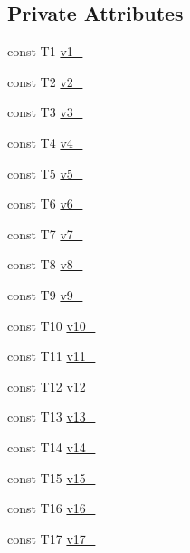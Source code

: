 \subsection*{\-Private \-Attributes}
\begin{DoxyCompactItemize}
\item 
const \-T1 \hyperlink{classtesting_1_1internal_1_1ValueArray17_aac1d0654cc6c1aceb4a5d0fa7a98042e}{v1\-\_\-}
\item 
const \-T2 \hyperlink{classtesting_1_1internal_1_1ValueArray17_a9f0a8ce6ce2fd27e980c4c51a7a7256a}{v2\-\_\-}
\item 
const \-T3 \hyperlink{classtesting_1_1internal_1_1ValueArray17_a4f8257321a2eab0456239174d6712d5e}{v3\-\_\-}
\item 
const \-T4 \hyperlink{classtesting_1_1internal_1_1ValueArray17_aac184059fee257381ccae81d8d112f85}{v4\-\_\-}
\item 
const \-T5 \hyperlink{classtesting_1_1internal_1_1ValueArray17_a1f3e0ada8419ed2e17cc61e6c0c54404}{v5\-\_\-}
\item 
const \-T6 \hyperlink{classtesting_1_1internal_1_1ValueArray17_a13d84d5824617bbc6fb1a6b3ee3cb745}{v6\-\_\-}
\item 
const \-T7 \hyperlink{classtesting_1_1internal_1_1ValueArray17_a4063f0b7a528133d018ee488ba44a9a3}{v7\-\_\-}
\item 
const \-T8 \hyperlink{classtesting_1_1internal_1_1ValueArray17_a596bc5260b2474271d1f6910ff6f665d}{v8\-\_\-}
\item 
const \-T9 \hyperlink{classtesting_1_1internal_1_1ValueArray17_a6356e16cf54a9dfac8525f20242af31e}{v9\-\_\-}
\item 
const \-T10 \hyperlink{classtesting_1_1internal_1_1ValueArray17_a147ca4457ea439b00a93087231ff77ef}{v10\-\_\-}
\item 
const \-T11 \hyperlink{classtesting_1_1internal_1_1ValueArray17_a12a4baf9ab57c7e9b5b4f1612e59e529}{v11\-\_\-}
\item 
const \-T12 \hyperlink{classtesting_1_1internal_1_1ValueArray17_a35ffe6d4d723857722ab319a235eddfc}{v12\-\_\-}
\item 
const \-T13 \hyperlink{classtesting_1_1internal_1_1ValueArray17_a8c6e803e306975fc3ed6717875688efa}{v13\-\_\-}
\item 
const \-T14 \hyperlink{classtesting_1_1internal_1_1ValueArray17_a812dbcac0513d6c5242ff4df1b8da6dd}{v14\-\_\-}
\item 
const \-T15 \hyperlink{classtesting_1_1internal_1_1ValueArray17_ab34fb63edf7d2b53ddbf7ac163123da0}{v15\-\_\-}
\item 
const \-T16 \hyperlink{classtesting_1_1internal_1_1ValueArray17_a8b2b80d31925c1583c3e694d2bf235c5}{v16\-\_\-}
\item 
const \-T17 \hyperlink{classtesting_1_1internal_1_1ValueArray17_a9f59ea9e6f3642f77227dd1f7882d649}{v17\-\_\-}
\end{DoxyCompactItemize}


